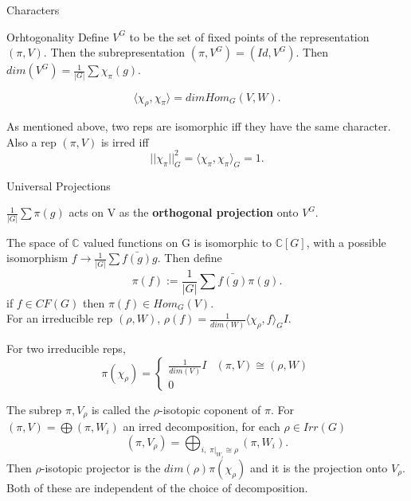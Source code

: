 \documentclass[12pt, letterpaper]{article}
\newcommand{\C}{\mathbb{C}}
\begin{document}
\begin{section}{Characters}
\begin{subsection}{Orhtogonality}
    Define \(V^{G}\) to be the set of fixed points of the representation
    \((\pi, V)\). Then the subrepresentation \((\pi, V^{G}) = (Id, V^{G})\).
    Then \(dim(V^{G}) = \frac{1}{|G|} \sum \chi_{\pi}(g)\).

    \[\langle \chi_{\rho}, \chi_{\pi} \rangle = dim Hom_{G}(V, W).\]

    As mentioned above, two reps are isomorphic iff they have the same
    character. Also a rep \((\pi, V)\) is irred iff \[||\chi_{\pi}||^{2}_{G} =
    \langle \chi_{\pi}, \chi_{\pi} \rangle_{G} = 1.\]

  \end{subsection}

  \begin{subsection}{Universal Projections}

    \(\frac{1}{|G|} \sum \pi(g)\) acts on V as the \textbf{orthogonal
      projection} onto \(V^{G}\).

    The space of \(\C\) valued functions on G is isomorphic to \(\C[G]\), with a
    possible isomorphism \(f \to \frac{1}{|G|} \sum \bar{f(g)} g\). Then
    define \[\pi(f) := \frac{1}{|G|} \sum \bar{f(g)} \pi(g).\] if
    \(f \in CF(G)\) then \(\pi(f) \in Hom_{G}(V)\). \\
    For an irreducible rep \((\rho, W)\), \(\rho(f) = \frac{1}{dim(W)}
    \langle \chi_{\rho}, f \rangle_{G} I\).

    For two irreducible reps, \[\pi(\chi_{\rho}) =
      \begin{cases}
        \frac{1}{dim(V)} I & (\pi, V) \cong (\rho, W) \\
        0
      \end{cases}\]

    The subrep \(\pi, V_{\rho}\) is called the \(\rho\)-isotopic coponent of
    \(\pi\). For \((\pi, V) = \bigoplus (\pi, W_{i})\) an irred decomposition, for
    each
    \(\rho \in Irr(G)\) \[(\pi, V_{\rho}) =
      \bigoplus_{i, \; \pi|_{W_{i}} \cong \rho} (\pi, W_{i}).\]
    Then \(\rho\)-isotopic projector is the \(dim(\rho) \pi(\chi_{\rho})\) and
    it is the projection onto \(V_{\rho}\). Both of these are independent of the
    choice of decomposition.

    \end{subsection}

\end{section}
\end{document}

